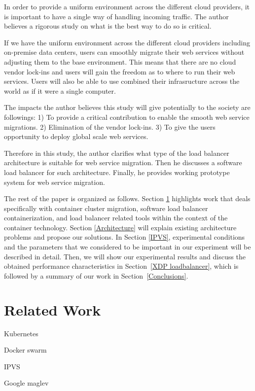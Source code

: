 In order to provide a uniform environment across the different cloud providers, it is important to have a single way of handling incoming traffic.
The author believes a rigorous study on what is the best way to do so is critical.

If we have the uniform environment across the different cloud providers including on-premise data centers, users can smoothly migrate their web services without adjusting them to the base environment.
This means that there are no cloud vendor lock-ins and users will gain the freedom as to where to run their web services.
Users will also be able to use combined their infrasructure across the world as if it were a single computer.

The impacts the author believes this study will give potentially to the society are followings:
1) To provide a critical contribution to enable the smooth web service migrations.
2) Elimination of the vendor lock-ins.
3) To give the users opportunity to deploy global scale web services.

Therefore in this study, the author clarifies what type of the load balancer architecture is suitable for web service migration. Then he discusses a software load balancer for such architecture. Finally, he provides working prototype system for web service migration.

The rest of the paper is organized as follows.
Section \ref{Related Work} highlights work that deals specifically with container cluster migration, 
software load balancer containerization, and load balancer related tools within the context of the container technology. 
Section \ref{Architecture} will explain existing architecture problems and propose our solutions.
In Section \ref{IPVS}, experimental conditions and the parameters 
that we considered to be important in our experiment will be described in detail.
Then, we will show our experimental results and discuss the obtained performance characteristics in Section~\ref{XDP loadbalancer},  
which is followed by a summary of our work in Section~\ref{Conclusions}.

\section{Related Work}\label{Related Work}

Kubernetes

Docker swarm

IPVS

Google maglev


